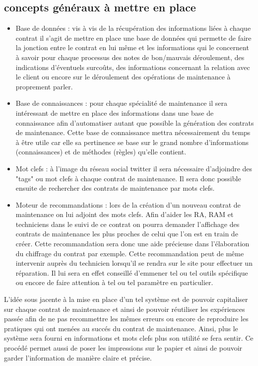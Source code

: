 \subsection {concepts généraux à mettre en place}
\begin{itemize}
\item Base de données : vis à vis de la récupération des informations liées à chaque contrat il s'agit de mettre en place une base de données qui permette de faire la jonction entre le contrat en lui même et les informations qui le concernent à savoir pour chaque processus des notes de bon/mauvais déroulement, des indications d'éventuels surcoûts, des informations concernant la relation avec le client ou encore sur le déroulement des opérations de maintenance à proprement parler. 
\item Base de connaissances : pour chaque spécialité de maintenance il sera intéressant de mettre en place des informations dans une base de connaissance afin d'automatiser autant que possible la génération des contrats de maintenance. Cette base de connaissance mettra nécessairement du temps à être utile car elle sa pertinence se base sur le grand nombre d'informations (connaissances) et de méthodes (règles) qu'elle contient.
\item Mot clefs : à l'image du réseau social twitter il sera nécessaire d'adjoindre des "tags" ou mot clefs à chaque contrat de maintenance. Il sera donc possible ensuite de rechercher des contrats de maintenance par mots clefs.
\item Moteur de recommandations : lors de la création d'un nouveau contrat de maintenance on lui adjoint des mots clefs. Afin d'aider les RA, RAM et techniciens dans le suivi de ce contrat on pourra demander l'affichage des contrats de maintenance les plus proches de celui que l'on est en train de créer. Cette recommandation sera donc une aide précieuse dans l'élaboration du chiffrage du contrat par exemple. Cette recommandation peut de même intervenir auprès du technicien lorsqu'il se rendra sur le site pour effectuer un réparation. Il lui sera en effet conseillé d'emmener tel ou tel outils spécifique ou encore de faire attention à tel ou tel paramètre en particulier.
\end{itemize}
L'idée sous jacente à la mise en place d'un tel système est de pouvoir capitaliser sur chaque contrat de maintenance et ainsi de pouvoir réutiliser les expériences passée afin de ne pas recommettre les mêmes erreurs ou encore de reproduire les pratiques qui ont menées au succés du contrat de maintenance. Ainsi, plus le système sera fourni en informations et mots clefs plus son utilité se fera sentir. Ce procédé permet aussi de \og poser les impressions sur le papier \fg et ainsi de pouvoir garder l'information de manière claire et précise.


